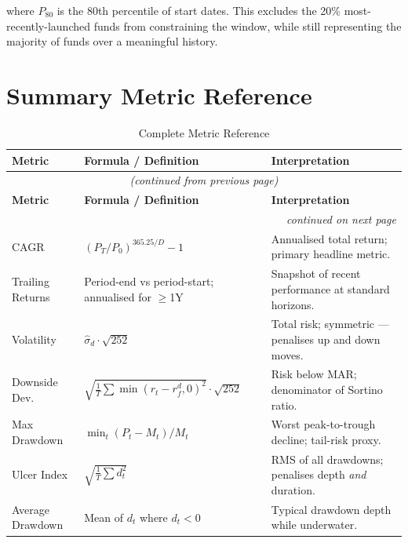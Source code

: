 \documentclass[12pt, a4paper]{article}
\begin{document}
where $P_{80}$ is the 80th percentile of start dates.  This excludes the
20\% most-recently-launched funds from constraining the window, while still
representing the majority of funds over a meaningful history.

\section{Summary Metric Reference}

\begin{longtable}{@{}p{3.8cm}p{5cm}p{5.2cm}@{}}
\caption{Complete Metric Reference}\\
\toprule
\textbf{Metric} & \textbf{Formula / Definition} & \textbf{Interpretation} \\
\midrule
\endfirsthead
\multicolumn{3}{c}{\textit{(continued from previous page)}}\\
\toprule
\textbf{Metric} & \textbf{Formula / Definition} & \textbf{Interpretation} \\
\midrule
\endhead
\midrule
\multicolumn{3}{r}{\textit{continued on next page}}\\
\endfoot
\bottomrule
\endlastfoot

CAGR
  & $(P_T/P_0)^{365.25/D} - 1$
  & Annualised total return; primary headline metric. \\[4pt]

Trailing Returns
  & Period-end vs period-start; annualised for $\geq$1Y
  & Snapshot of recent performance at standard horizons. \\[4pt]

Volatility
  & $\hat\sigma_d \cdot \sqrt{252}$
  & Total risk; symmetric — penalises up and down moves. \\[4pt]

Downside Dev.
  & $\sqrt{\tfrac{1}{T}\sum\min(r_t - r_f^d, 0)^2} \cdot \sqrt{252}$
  & Risk below MAR; denominator of Sortino ratio. \\[4pt]

Max Drawdown
  & $\min_t (P_t - M_t)/M_t$
  & Worst peak-to-trough decline; tail-risk proxy. \\[4pt]

Ulcer Index
  & $\sqrt{\tfrac{1}{T}\sum d_t^2}$
  & RMS of all drawdowns; penalises depth \emph{and} duration. \\[4pt]

Average Drawdown
  & Mean of $d_t$ where $d_t < 0$
  & Typical drawdown depth while underwater. \\[4pt]


\end{longtable}
\end{document}
